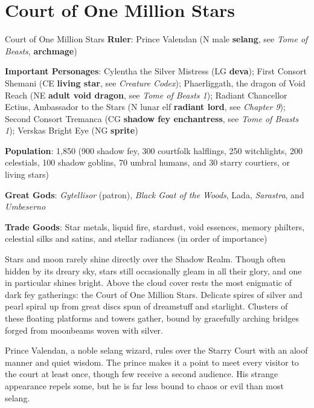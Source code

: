 \documentclass[10pt,a4paper,twoside,bg=print,twocolumn,openany,nodeprecatedcode]{dndbook}
\begin{document}
\section{Court of One Million Stars}
\begin{DndSidebar}[float=!b]{Court of One Million Stars}
\textbf{Ruler}: Prince Valendan (N male \textbf{selang}, see \textit{Tome of Beasts}, \textbf{archmage})



\textbf{Important Personages}: Cylentha the Silver Mistress (LG \textbf{deva}); First Consort Shemani (CE \textbf{living star}, see \textit{Creature Codex}); Phaerliggath, the dragon of Void Reach (NE \textbf{adult void dragon}, see \textit{Tome of Beasts 1}); Radiant Chancellor Ectius, Ambassador to the Stars (N lunar elf \textbf{radiant lord}, see \textit{Chapter 9}); Second Consort Tremanca (CG \textbf{shadow fey enchantress}, see \textit{Tome of Beasts 1}); Verskas Bright Eye (NG \textbf{sprite})



\textbf{Population}: 1,850 (900 shadow fey, 300 courtfolk halflings, 250 witchlights, 200 celestials, 100 shadow goblins, 70 umbral humans, and 30 starry courtiers, or living stars)



\textbf{Great Gods}: \textit{Gytellisor} (patron), \textit{Black Goat of the Woods}, Lada, \textit{Sarastra}, and \textit{Umbeserno}



\textbf{Trade Goods}: Star metals, liquid fire, stardust, void essences, memory philters, celestial silks and satins, and stellar radiances (in order of importance)





\end{DndSidebar}

Stars and moon rarely shine directly over the Shadow Realm. Though often hidden by its dreary sky, stars still occasionally gleam in all their glory, and one in particular shines bright. Above the cloud cover rests the most enigmatic of dark fey gatherings: the Court of One Million Stars. Delicate spires of silver and pearl spiral up from great discs spun of dreamstuff and starlight. Clusters of these floating platforms and towers gather, bound by gracefully arching bridges forged from moonbeams woven with silver.

Prince Valendan, a noble selang wizard, rules over the Starry Court with an aloof manner and quiet wisdom. The prince makes it a point to meet every visitor to the court at least once, though few receive a second audience. His strange appearance repels some, but he is far less bound to chaos or evil than most selang.
\end{document}

